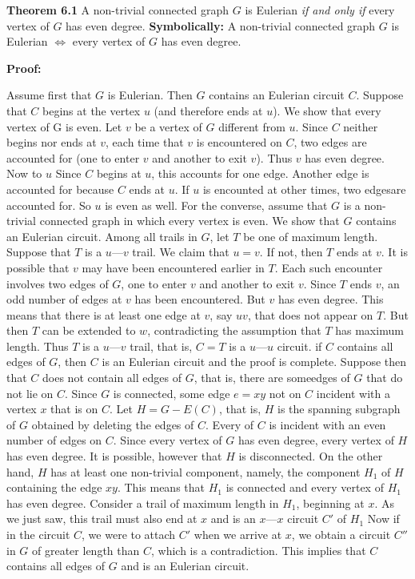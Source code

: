 \nopagenumbers
{\bf Theorem 6.1}
\vskip 6pt
A non-trivial connected graph $G$ is Eulerian {\it if and only if} every vertex of $G$ has even degree.
\vskip 10pt
{\bf Symbolically:}
A non-trivial connected graph $G$ is Eulerian $\Leftrightarrow$ every vertex of $G$ has even degree.

\vskip 10pt
{\bf Proof:}
\vskip 6pt

Assume first that $G$ is Eulerian. Then $G$ contains an Eulerian circuit $C$. Suppose that $C$ begins at the
vertex $u$ (and therefore ends at $u$). We show that every vertex of G is even. Let $v$ be a vertex of $G$ different from $u$.
Since $C$ neither begins nor ends at $v$, each time that $v$ is encountered on $C$, two edges are accounted for (one to enter $v$ and another to exit $v$).
Thus $v$ has even degree. Now to $u$ Since $C$ begins at $u$, this accounts for one edge. Another edge is accounted for because $C$ ends at $u$. If $u$ is encounted at other
times, two edgesare accounted for. So $u$ is even as well.
\vskip 1mm
For the converse, assume that $G$ is a non-trivial connected graph in which every vertex is even. We show that $G$ contains an Eulerian circuit. Among all trails in $G$, let
$T$ be one of maximum length. Suppose that $T$ is a $u$---$v$ trail. We claim that $u=v$. If not, then $T$ ends at $v$. It is possible that $v$ may have been encountered earlier in $T$.
Each such encounter involves two edges of $G$, one to enter $v$ and another to exit $v$. Since $T$ ends $v$, an odd number of edges at $v$ has been encountered. But $v$ has even degree.
This means that there is at least one edge at $v$, say $uv$, that does not appear on $T$. But then $T$ can be extended to $w$, contradicting the assumption that $T$ has maximum length. Thus $T$
is a $u$---$v$ trail, that is, $C=T$ is a $u$---$u$ circuit. if $C$ contains all edges of $G$, then $C$ is an Eulerian circuit and the proof is complete.
\vskip 1mm
Suppose then that $C$ does not contain all edges of $G$, that is, there are someedges of $G$ that do not lie on $C$. Since $G$ is connected, some edge $e=xy$ not on $C$ incident with a vertex $x$
that is on $C$. Let $H=G-E(C)$, that is, $H$ is the spanning subgraph of $G$ obtained by deleting the edges of $C$. Every of $C$ is incident with an even number of edges on $C$. Since every vertex of $G$
has even degree, every vertex of $H$ has even degree. It is possible, however that $H$ is disconnected. On the other hand, $H$ has at least one non-trivial component, namely, the component $H_1$ of $H$ containing
the edge $xy$. This means that $H_1$ is connected and every vertex of $H_1$ has even degree. Consider a trail of maximum length in $H_1$, beginning at $x$. As we just saw, this trail must also end
at $x$ and is an $x$---$x$ circuit $C'$ of $H_1$
\vskip 1mm
Now if in the circuit $C$, we were to attach $C'$ when we arrive at $x$, we obtain a circuit $C''$ in $G$ of greater length than $C$, which is a contradiction. This implies that $C$ contains all edges of $G$
and is an Eulerian circuit.

